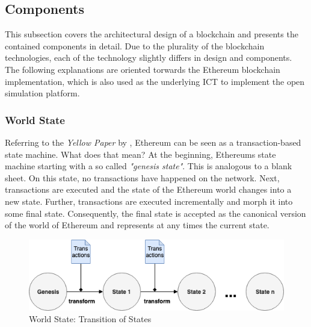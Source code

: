 \subsection{Components}
This subsection covers the architectural design of a blockchain and presents the contained components in detail. Due to the plurality of the blockchain technologies, each of the technology slightly differs in design and components. The following explanations are oriented torwards the Ethereum blockchain implementation, which is also used as the underlying ICT to implement the open simulation platform.

\subsubsection{World State}
\label{sec:world_state}
Referring to the \textit{Yellow Paper} by , Ethereum can be seen as a transaction-based state machine. What does that mean? At the beginning, Ethereums state machine starting with a so called \textit{"genesis state"}. This is analogous to a blank sheet. On this state, no transactions have happened on the network. Next, transactions are executed and the state of the Ethereum world changes into a new state. Further, transactions are executed incrementally and morph it into some final state. Consequently, the final state is accepted as the canonical version of the world of Ethereum and represents at any times the current state.

\begin{figure}[htbp]
	\centering
	\includegraphics[width=.75\linewidth]{./figures/state_transition.png}
	\caption{World State: Transition of States}
	\label{figure:state_transition}
\end{figure}

